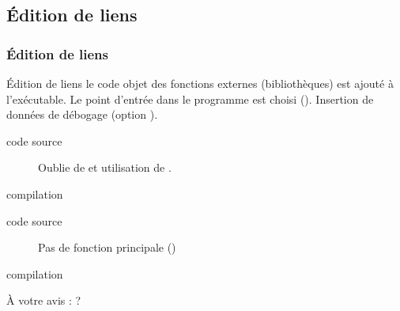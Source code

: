 \documentclass[xcolor=pdftex,svgnames,table]{beamer}
\begin{document}
\subsection{Édition de liens}
\begin{frame}
\frametitle{Édition de liens}
\begin{block}{Édition de liens\youwrite}
  le code objet des fonctions externes
  (bibliothèques) est ajouté à l'exécutable. Le point d'entrée dans le
  programme est choisi (). Insertion de données de débogage (option ).
\end{block}
\pause%
\begin{description}
\item[code source] Oublie de  et utilisation de .
\item[compilation] 
\end{description}
\pause
\begin{description}
\item[code source] Pas de fonction principale ()
\item[compilation] 
\end{description}
\pause
À votre avis :  ?
\end{frame}
\end{document}
